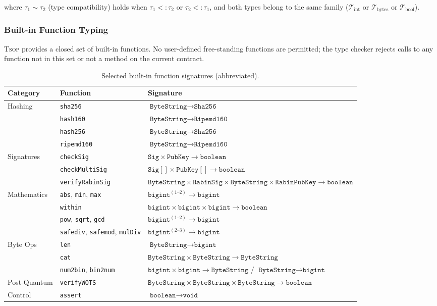 \documentclass[11pt,a4paper]{article}
\newcommand{\tsop}{\textsc{Tsop}}
\newcommand{\bs}{\texttt{ByteString}}
\newcommand{\bigintty}{\texttt{bigint}}
\newcommand{\boolty}{\texttt{boolean}}
\newcommand{\voidty}{\texttt{void}}
\newcommand{\subtype}{\mathrel{<:}}
\begin{document}
where $\tau_1 \sim \tau_2$ (type compatibility) holds when $\tau_1 \subtype \tau_2$ or $\tau_2 \subtype \tau_1$, and both types belong to the same family ($\mathcal{T}_{\mathrm{int}}$ or $\mathcal{T}_{\mathrm{bytes}}$ or $\mathcal{T}_{\mathrm{bool}}$).

\subsubsection{Built-in Function Typing}

\tsop{} provides a closed set of built-in functions. No user-defined
free-standing functions are permitted; the type checker rejects calls to any
function not in this set or not a method on the current contract.

\begin{table}[h]
\centering
\small
\begin{tabularx}{\textwidth}{@{}llX@{}}
\toprule
\textbf{Category} & \textbf{Function} & \textbf{Signature} \\
\midrule
\multirow{4}{*}{Hashing}
  & \texttt{sha256} & $\bs \to \texttt{Sha256}$ \\
  & \texttt{hash160} & $\bs \to \texttt{Ripemd160}$ \\
  & \texttt{hash256} & $\bs \to \texttt{Sha256}$ \\
  & \texttt{ripemd160} & $\bs \to \texttt{Ripemd160}$ \\
\midrule
\multirow{3}{*}{Signatures}
  & \texttt{checkSig} & $\texttt{Sig} \times \texttt{PubKey} \to \boolty$ \\
  & \texttt{checkMultiSig} & $\texttt{Sig}[] \times \texttt{PubKey}[] \to \boolty$ \\
  & \texttt{verifyRabinSig} & $\bs \times \texttt{RabinSig} \times \bs \times \texttt{RabinPubKey} \to \boolty$ \\
\midrule
\multirow{4}{*}{Mathematics}
  & \texttt{abs}, \texttt{min}, \texttt{max} & $\bigintty^{(1\text{--}2)} \to \bigintty$ \\
  & \texttt{within} & $\bigintty \times \bigintty \times \bigintty \to \boolty$ \\
  & \texttt{pow}, \texttt{sqrt}, \texttt{gcd} & $\bigintty^{(1\text{--}2)} \to \bigintty$ \\
  & \texttt{safediv}, \texttt{safemod}, \texttt{mulDiv} & $\bigintty^{(2\text{--}3)} \to \bigintty$ \\
\midrule
\multirow{3}{*}{Byte Ops}
  & \texttt{len} & $\bs \to \bigintty$ \\
  & \texttt{cat} & $\bs \times \bs \to \bs$ \\
  & \texttt{num2bin}, \texttt{bin2num} & $\bigintty \times \bigintty \to \bs$ / $\bs \to \bigintty$ \\
\midrule
Post-Quantum
  & \texttt{verifyWOTS} & $\bs \times \bs \times \bs \to \boolty$ \\
\midrule
Control
  & \texttt{assert} & $\boolty \to \voidty$ \\
\bottomrule
\end{tabularx}
\caption{Selected built-in function signatures (abbreviated).}
\label{tab:builtins}
\end{table}
\end{document}
